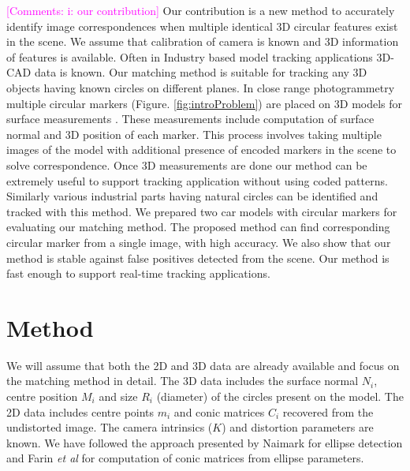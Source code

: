 \documentclass{bmvc2k}
\newcommand{\comments}[1]{\textcolor{magenta}{[Comments: #1]}}
\def\etal{\emph{et al}\bmvaOneDot}
\begin{document}
\comments{i: our contribution}
Our contribution is a new method to accurately identify image correspondences when multiple identical 3D circular features exist in the scene. We assume that calibration of camera is known and 3D information of features is available. 
Often in Industry based model tracking applications 3D-CAD data is known. Our matching method is suitable for tracking any 3D objects having known circles on different planes. In close range photogrammetry multiple circular markers (Figure. \ref{fig:introProblem}) are placed on 3D models for surface measurements \cite{luhmann_close_2006}. 
These measurements include computation of surface normal and 3D position of each marker. 
This process involves taking multiple images of the model with additional presence of encoded markers in the scene to solve correspondence. 
Once 3D measurements are done our method can be extremely useful to support tracking application without using coded patterns. Similarly various industrial parts having natural circles can be identified and tracked with this method. 
We prepared two car models with circular markers for evaluating our matching method. The proposed method can find corresponding circular marker from a single image, with high accuracy. We also show that our method is stable against false positives detected from the scene. Our method is fast enough to support real-time tracking applications. 



\section{Method}
We will assume that both the 2D and 3D data are already available and focus on the matching method in detail. 
The 3D data includes the surface normal $N_i$, centre position $M_i$ and size $R_i$ (diameter) of the circles present on the model. 
The 2D data includes centre points $m_i$ and conic matrices $C_i$ recovered from the undistorted image. The camera intrinsics ($K$) and distortion parameters are known. 
We have followed the approach presented by Naimark \cite{naimark_circular_2002} for ellipse detection and Farin \etal \cite{farin_geometry_1998} for computation of conic matrices from ellipse parameters. 
\end{document}
